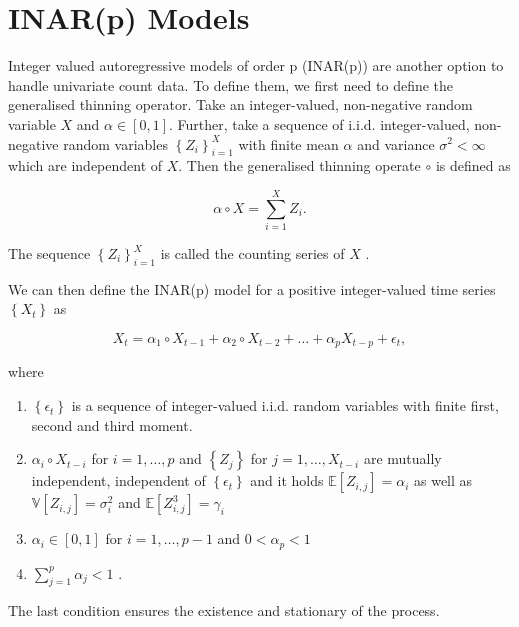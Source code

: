 \section{INAR(p) Models}
\label{sec: Inar Models}

Integer valued autoregressive models of order p (INAR(p)) are another option to handle univariate count data. To define them, we first need to define the generalised thinning operator. Take an integer-valued, non-negative random variable $X$ and $\alpha \in [0,1]$. Further, take a sequence of i.i.d. integer-valued, non-negative random variables $\left\{Z_i \right\}_{i=1}^X$ with finite mean $\alpha$ and variance $\sigma^2<\infty $ which are independent of $X$. Then the generalised thinning operate $\circ$ is defined as

\begin{equation}
\alpha \circ X = \sum_{i=1}^X Z_i .
\label{eq:Thinning operator}
\end{equation}

The sequence  $\left\{Z_i \right\}_{i=1}^X$ is called the counting series of $X$ \cite{Silva:2005}. 

We can then define the INAR(p) model for a positive integer-valued time series $\left\{X_t \right\}$ as

\begin{equation}
X_t = \alpha_1 \circ X_{t-1} + \alpha_2 \circ X_{t-2} + \ldots + \alpha_p X_{t-p} +\epsilon_t ,
\label{eq:Inar(p) model}
\end{equation}

where

\begin{enumerate}
	\item $\left\{\epsilon_t\right\}$ is a sequence of integer-valued i.i.d. random variables with finite first, second and third moment. 
	\item $\alpha_i \circ X_{t-i}$ for $i= 1,\ldots,p$ and $\left\{Z_j \right\}$ for $j=1,\ldots,X_{t-i}$ are mutually independent, independent of $\left\{\epsilon_t\right\}$ and it holds $\mathbb{E}[Z_{i,j}]=\alpha_i$ as well as $\mathbb{V}[Z_{i,j}] = \sigma_i^2$ and $\mathbb{E}[Z_{i,j}^3] = \gamma_i$
	\item $\alpha_i \in [0,1]$ for $i=1,\ldots,p-1$ and $0 < \alpha_p < 1$
	\item $\sum_{j=1}^p \alpha_j < 1$ \cite{Silva:2005}. 
\end{enumerate}


The last condition ensures the existence and stationary of the process. 

